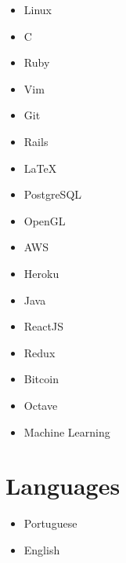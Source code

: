 \documentclass[a4paper,twoside]{simplecv}
\begin{document}
\begin{multicols}{4}
	\raggedcolumns
	\begin{itemize}
		\item Linux
		\item C
		\item Ruby
		\item Vim
		\item Git
		\item Rails
		\item \LaTeX{}
		\item PostgreSQL
		\item OpenGL
		\item AWS
		\item Heroku
		\item Java
		\item ReactJS
		\item Redux
		\item Bitcoin
		\item Octave
		\item Machine Learning
	\end{itemize}
\end{multicols}

\section{Languages}

\begin{multicols}{4}
	\raggedcolumns
	\begin{itemize}
		\item Portuguese
		\item English
	\end{itemize}
\end{multicols}

%
\end{document}

